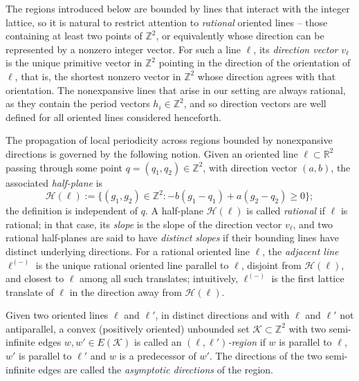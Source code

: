 \documentclass[12pt]{amsart}
\numberwithin{equation}{section}
\newcommand{\bb}[1]{\mathbb{#1}}
\begin{document}
The regions introduced below are bounded by lines that interact with the
integer lattice, so it is natural to restrict attention to \emph{rational}
oriented lines -- those containing at least two points of $\mathbb{Z}^2$,
or equivalently whose direction can be represented by a nonzero integer
vector. For such a line $\pmb{\ell}$, its \emph{direction vector}
$v_{\pmb{\ell}}$ is the unique primitive vector in $\mathbb{Z}^2$ pointing
in the direction of the orientation of $\pmb{\ell}$, that is, the shortest
nonzero vector in $\mathbb{Z}^2$ whose direction agrees with that orientation.
The nonexpansive lines that arise in our setting are always rational, as
they contain the period vectors $h_i \in \mathbb{Z}^2$, and so direction
vectors are well defined for all oriented lines considered henceforth.

The propagation of local periodicity across regions bounded by nonexpansive directions is governed by the following notion. Given an oriented line $ \pmb{\ell} \subset \mathbb R^2 $ passing through some point $ q = (q_1, q_2) \in \mathbb Z^2 $, with direction vector $ (a, b) $, the associated \emph{half-plane} is
\[
\mathcal H(\pmb{\ell}) := \{ (g_1,g_2) \in \mathbb Z^2 : - b(g_1 - q_1) + a(g_2 - q_2) \ge 0 \};
\]
the definition is independent of $q$. 
A half-plane $\mathcal{H}(\pmb{\ell})$ is called \emph{rational} if $\pmb{\ell}$ is rational; in that case, its
\emph{slope} is the slope of the direction vector $v_{\pmb{\ell}}$, and two rational half-planes are said to have \emph{distinct slopes} if their bounding lines have distinct underlying directions. For a rational oriented line $\pmb{\ell}$, the \emph{adjacent line} $\pmb{\ell}^{(-)}$ \cite[Definition~2.2]{Colle23} is the unique rational oriented line parallel to $ \pmb{\ell} $, disjoint from $\mathcal H(\pmb{\ell})$, and closest to $\pmb{\ell}$ among all such translates; intuitively, $ \pmb{\ell}^{(-)} $ is the first lattice translate of $ \pmb{\ell} $ in the direction away from $\mathcal H(\pmb{\ell})$.

Given two oriented lines $\pmb{\ell}$ and $\pmb{\ell}'$, in distinct directions and with $\pmb{\ell}$ and $\pmb{\ell}'$ not antiparallel, a convex (positively oriented) unbounded set $\mathcal{K} \subset \bb{Z}^2$ with two semi-infinite edges $w,w' \in E(\mathcal{K})$ is called an \emph{$(\pmb{\ell}, \pmb{\ell}')$-region} if $w$ is parallel to $\pmb{\ell}$, $w'$ is parallel to $\pmb{\ell}'$ and $w$ is a predecessor of $w'$. The directions of the two semi-infinite edges are called the \emph{asymptotic directions} of the region. 
\end{document}
